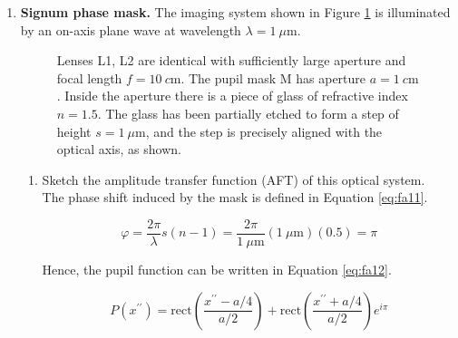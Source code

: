 \documentclass[main.tex]{subfiles}
\begin{document}
\begin{enumerate}
\item{\textbf{Signum phase mask.} The imaging system shown in Figure \ref{fig:f1} is illuminated by an on-axis plane wave at wavelength $\lambda=\SI{1}{\mu \meter}$. }

\begin{figure}
\centering{}
\caption{Lenses L1, L2 are identical with sufficiently large aperture and focal length $f=\SI{10}{c\metre}$. The pupil mask M has aperture $a=\SI{1}{c\metre}$. Inside the aperture there is a piece of glass of refractive index $n=1.5$. The glass has been partially etched to form a step of height $s=\SI{1}{\mu \metre}$, and the step is precisely aligned with the optical axis, as shown.}
\label{fig:f1}
\end{figure}

\begin{enumerate}
\item{Sketch the amplitude transfer function (AFT) of this optical system.}\\

The phase shift induced by the mask is defined in Equation \ref{eq:fa11}.

\begin{equation}\label{eq:fa11}
\varphi = \frac{2\pi}{\lambda}s(n-1) = \frac{2\pi}{\SI{1}{\mu \metre}}(\SI{1}{\mu \metre})(0.5)=\pi
\end{equation}

Hence, the pupil function can be written in Equation \ref{eq:fa12}.

\begin{equation}\label{eq:fa12}
P(x^{\prime \prime}) = \text{rect}(\frac{x^{\prime \prime} - a/4}{a/2}) + \text{rect}(\frac{x^{\prime \prime} + a/4}{a/2}) e^{i\pi}
\end{equation}


\end{enumerate}
\end{enumerate}
\end{document}
